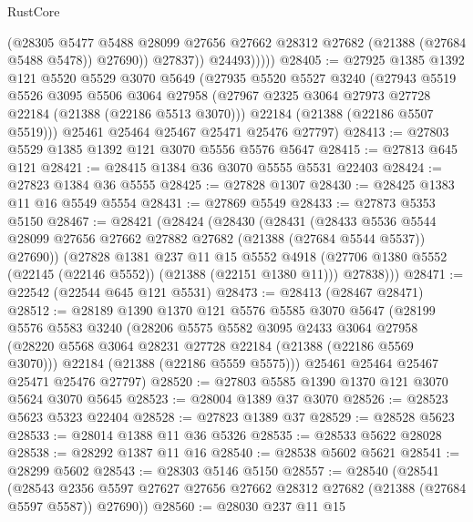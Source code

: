 \begin{lexlean}{RustCore}
\begin{coremodule}
                    (@28305
                      @5477
                      @5488
                      @28099
                      @27656
                      @27662
                      @28312
                      @27682
                      (@21388 (@27684 @5488 @5478))
                      @27690))
                  @27837))
              @24493)))))
@28405 := @27925
    @1385
    @1392
    @121
    @5520
    @5529
    @3070
    @5649
    (@27935
      @5520
      @5527
      @3240
      (@27943
        @5519
        @5526
        @3095
        @5506
        @3064
        @27958
        (@27967 @2325 @3064 @27973 @27728 @22184 (@21388 (@22186 @5513 @3070)))
        @22184
        (@21388 (@22186 @5507 @5519)))
      @25461
      @25464
      @25467
      @25471
      @25476
      @27797)
@28413 := @27803 @5529 @1385 @1392 @121 @3070 @5556 @5576 @5647
@28415 := @27813 @645 @121
@28421 := @28415 @1384 @36 @3070 @5555 @5531 @22403
@28424 := @27823 @1384 @36 @5555
@28425 := @27828 @1307
@28430 := @28425 @1383 @11 @16 @5549 @5554
@28431 := @27869 @5549
@28433 := @27873 @5353 @5150
@28467 := @28421
    (@28424
      (@28430
        (@28431
          (@28433
            @5536
            @5544
            @28099
            @27656
            @27662
            @27882
            @27682
            (@21388 (@27684 @5544 @5537))
            @27690))
        (@27828
          @1381
          @237
          @11
          @15
          @5552
          @4918
          (@27706 @1380 @5552 (@22145 (@22146 @5552)) (@21388 (@22151 @1380 @11)))
          @27838)))
@28471 := @22542 (@22544 @645 @121 @5531)
@28473 := @28413 (@28467 @28471)
@28512 := @28189
    @1390
    @1370
    @121
    @5576
    @5585
    @3070
    @5647
    (@28199
      @5576
      @5583
      @3240
      (@28206
        @5575
        @5582
        @3095
        @2433
        @3064
        @27958
        (@28220 @5568 @3064 @28231 @27728 @22184 (@21388 (@22186 @5569 @3070)))
        @22184
        (@21388 (@22186 @5559 @5575)))
      @25461
      @25464
      @25467
      @25471
      @25476
      @27797)
@28520 := @27803 @5585 @1390 @1370 @121 @3070 @5624 @3070 @5645
@28523 := @28004 @1389 @37 @3070
@28526 := @28523 @5623 @5323 @22404
@28528 := @27823 @1389 @37
@28529 := @28528 @5623
@28533 := @28014 @1388 @11 @36 @5326
@28535 := @28533 @5622 @28028
@28538 := @28292 @1387 @11 @16
@28540 := @28538 @5602 @5621
@28541 := @28299 @5602
@28543 := @28303 @5146 @5150
@28557 := @28540
    (@28541
      (@28543 @2356 @5597 @27627 @27656 @27662 @28312 @27682 (@21388 (@27684 @5597 @5587)) @27690))
@28560 := @28030 @237 @11 @15

\end{coremodule}
\end{lexlean}

